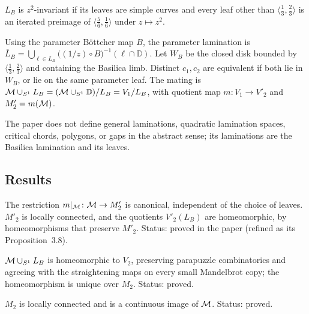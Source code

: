 \begin{definition}
\label{def:matings-invariant}
$L_B$ is $z^2$-invariant if its leaves are simple curves and every leaf other than
$\langle\frac13,\frac23\rangle$ is an iterated preimage of $\langle\frac56,\frac16\rangle$ under $z\mapsto z^2$.
\end{definition}

\begin{definition}
\label{def:matings-parameter}
Using the parameter B\"ottcher map $B$, the parameter lamination is
$\overline L_B=\bigcup_{\ell\in L_B}\bigl((1/z)\circ B\bigr)^{-1}(\ell\cap\mathbb D)$.  Let $W_B$ be the
closed disk bounded by $\langle\frac13,\frac23\rangle$ and containing the Basilica limb.  Distinct
$c_1,c_2$ are equivalent if both lie in $W_B$, or lie on the same parameter leaf.  The mating is
$\mathcal M\cup_{S^1}L_B=(\mathcal M\cup_{S^1}\mathbb D)/L_B=V_1/L_B$, with quotient map $m\colon V_1\to V'_2$ and
$M'_2=m(\mathcal M)$.
\end{definition}

\begin{remark}
The paper does not define general laminations, quadratic lamination spaces, critical chords,
polygons, or gaps in the abstract sense; its laminations are the Basilica lamination and its leaves.
\end{remark}

\subsection*{Results}

\begin{theorem}
\label{thm:matings-1-1}
The restriction $m|_\mathcal M\colon\mathcal M\to M'_2$ is canonical, independent of the choice of leaves.  $M'_2$ is
locally connected, and the quotients $V'_2(L_B)$ are homeomorphic, by homeomorphisms that preserve $M'_2$.
Status: proved in the paper (refined as its Proposition~3.8).
\end{theorem}

\begin{theorem}
\label{thm:matings-1-2}
$\mathcal M\cup_{S^1}L_B$ is homeomorphic to $V_2$, preserving parapuzzle combinatorics and agreeing with the
straightening maps on every small Mandelbrot copy; the homeomorphism is unique over $M_2$.  Status: proved.
\end{theorem}

\begin{corollary}
\label{cor:matings-1-3}
$M_2$ is locally connected and is a continuous image of $\mathcal M$.  Status: proved.
\end{corollary}

